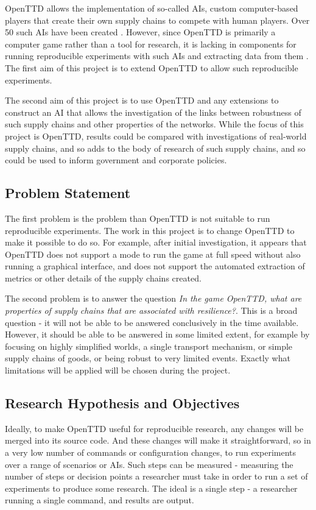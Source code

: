 \documentclass[a4paper,11pt]{article}
\begin{document}
OpenTTD allows the implementation of so-called AIs, custom computer-based players that create their own supply chains to compete with human players. Over 50 such AIs have been created \cite{openttdAIs}. However, since OpenTTD is primarily a computer game rather than a tool for research, it is lacking in components for running reproducible experiments with such AIs and extracting data from them \cite{openttdNoHeadless}. The first aim of this project is to extend OpenTTD to allow such reproducible experiments.

The second aim of this project is to use OpenTTD and any extensions to construct an AI that allows the investigation of the links between robustness of such supply chains and other properties of the networks. While the focus of this project is OpenTTD, results could be compared with investigations of real-world supply chains, and so adds to the body of research of such supply chains, and so could be used to inform government and corporate policies.

\subsection{Problem Statement}

The first problem is the problem than OpenTTD is not suitable to run reproducible experiments. The work in this project is to change OpenTTD to make it possible to do so. For example, after initial investigation, it appears that OpenTTD does not support a mode to run the game at full speed without also running a graphical interface, and does not support the automated extraction of metrics or other details of the supply chains created.

The second problem is to answer the question \emph{In the game OpenTTD, what are properties of supply chains that are associated with resilience?}. This is a broad question - it will not be able to be answered conclusively in the time available. However, it should be able to be answered in some limited extent, for example by focusing on highly simplified worlds, a single transport mechanism, or simple supply chains of goods, or being robust to very limited events. Exactly what limitations will be applied will be chosen during the project.

\subsection{Research Hypothesis and Objectives}

Ideally, to make OpenTTD useful for reproducible research, any changes will be merged into its source code. And these changes will make it straightforward, so in a very low number of commands or configuration changes, to run experiments over a range of scenarios or AIs. Such steps can be measured - measuring the number of steps or decision points a researcher must take in order to run a set of experiments to produce some research. The ideal is a single step - a researcher running a single command, and results are output.
\end{document}
